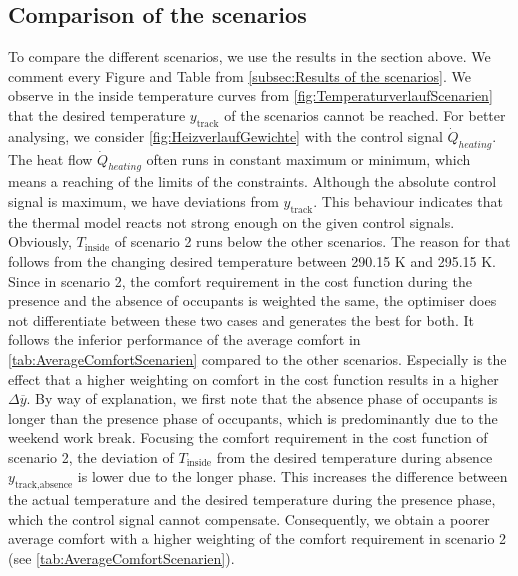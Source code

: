 \subsection{Comparison of the scenarios}
\label{subsec:Comparison fo the scenarios}
To compare the different scenarios, we use the results in the section above. We comment every Figure and Table from \autoref{subsec:Results of the scenarios}. \newline
We observe in the inside temperature curves from \autoref{fig:TemperaturverlaufScenarien} that the desired temperature $y_\text{track}$ of the scenarios cannot be reached. For better analysing, we consider \autoref{fig:HeizverlaufGewichte} with the control signal $\dot{Q}_{heating}$. The heat flow $\dot{Q}_{heating}$ often runs in constant maximum or minimum, which means a reaching of the limits of the constraints. Although the absolute control signal is maximum, we have deviations from $y_\text{track}$. This behaviour indicates that the thermal model reacts not strong enough on the given control signals.\newline
Obviously, $T_\text{inside}$ of scenario 2 runs below the other scenarios. The reason for that follows from the changing desired temperature between 290.15 K and 295.15 K. Since in scenario 2, the comfort requirement in the cost function during the presence and the absence of occupants is weighted the same, the optimiser does not differentiate between these two cases and generates the best for both. It follows the inferior performance of the average comfort in \autoref{tab:AverageComfortScenarien} compared to the other scenarios. Especially is the effect that a higher weighting on comfort in the cost function results in a higher $\Delta \overline{y}$. By way of explanation, we first note that the absence phase of occupants is longer than the presence phase of occupants, which is predominantly due to the weekend work break. Focusing the comfort requirement in the cost function of scenario 2, the deviation of $T_\text{inside}$ from the desired temperature during absence $y_\text{track,absence}$ is lower due to the longer phase. This increases the difference between the actual temperature and the desired temperature during the presence phase, which the control signal cannot compensate. Consequently, we obtain a poorer average comfort with a higher weighting of the comfort requirement in scenario 2 (see \autoref{tab:AverageComfortScenarien}).\newline 
